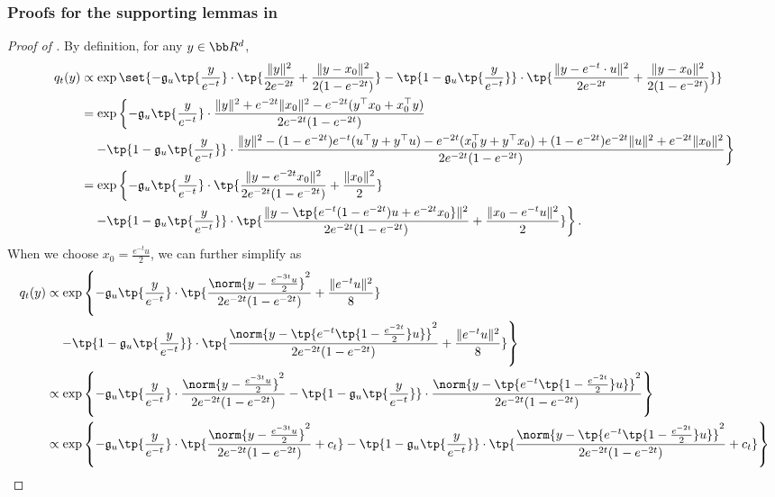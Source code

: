 \subsubsection{Proofs for the supporting lemmas in }\label{subsec:proof2}
\begin{proof}[Proof of ]
    By definition, for any $y\in \bb R^d$,
    \begin{align}
        q_t(y) &\propto \exp\set{-\mathfrak{g}_{u}\tp{\frac{y}{e^{-t}}}\cdot \tp{\frac{\|y\|^2}{2e^{-2t}} +\frac{\|y-x_0\|^2}{2(1-e^{-2t})}} - \tp{1-\mathfrak{g}_{u}\tp{\frac{y}{e^{-t}}}}\cdot \tp{\frac{\|y-e^{-t}\cdot u\|^2}{2e^{-2t}} + \frac{\|y-x_0\|^2}{2(1-e^{-2t})}} } \notag \\
        &= \exp\left\{-\mathfrak{g}_{u}\tp{\frac{y}{e^{-t}}}\cdot \frac{\|y\|^2 + e^{-2t}\|x_0\|^2 - e^{-2t}(y^{\top}x_0 + x_0^{\top}y)}{2e^{-2t}(1-e^{-2t})} \right. \notag \\
        & \quad  \left. - \tp{1-\mathfrak{g}_{u}\tp{\frac{y}{e^{-t}}}}\cdot \frac{\|y\|^2 - (1-e^{-2t})e^{-t}(u^{\top}y + y^{\top}u) - e^{-2t}(x_0^{\top}y + y^{\top}x_0) + (1-e^{-2t})e^{-2t}\|u\|^2 + e^{-2t}\|x_0\|^2}{2e^{-2t}(1-e^{-2t})} \right\} \notag  \\
        &= \exp\left\{-\mathfrak{g}_{u}\tp{\frac{y}{e^{-t}}}\cdot \tp{\frac{\|y-e^{-2t}x_0\|^2}{2e^{-2t}(1-e^{-2t})} + \frac{\|x_0\|^2}{2}} \right. \notag \\
        & \quad \left.- \tp{1-\mathfrak{g}_{u}\tp{\frac{y}{e^{-t}}}}\cdot \tp{\frac{\|y- \tp{e^{-t}(1-e^{-2t})u + e^{-2t}x_0}\|^2}{2e^{-2t}(1-e^{-2t})} + \frac{\|x_0 - e^{-t}u\|^2}{2}}\right\}.\label{eq:stitched1}
    \end{align}
    When we choose $x_0 = \frac{e^{-t}u}{2}$, we can further simplify  as
    \begin{align*}
        q_t(y) & \propto \exp\left\{-\mathfrak{g}_{u}\tp{\frac{y}{e^{-t}}}\cdot \tp{\frac{\norm{y-\frac{e^{-3t}u}{2}}^2}{2e^{-2t}(1-e^{-2t})} + \frac{\|e^{-t}u\|^2}{8}} \right. \notag \\
        & \quad \left.- \tp{1-\mathfrak{g}_{u}\tp{\frac{y}{e^{-t}}}}\cdot \tp{\frac{\norm{y- \tp{e^{-t}\tp{1-\frac{e^{-2t}}{2}}u }}^2}{2e^{-2t}(1-e^{-2t})} + \frac{\|e^{-t}u\|^2}{8}}\right\} \notag  \\
        &\propto \exp\left\{-\mathfrak{g}_{u}\tp{\frac{y}{e^{-t}}}\cdot \frac{\norm{y-\frac{e^{-3t}u}{2}}^2}{2e^{-2t}(1-e^{-2t})}  - \tp{1-\mathfrak{g}_{u}\tp{\frac{y}{e^{-t}}}}\cdot \frac{\norm{y- \tp{e^{-t}\tp{1-\frac{e^{-2t}}{2}}u }}^2}{2e^{-2t}(1-e^{-2t})} \right\}  \notag \\
        &\propto \exp\left\{-\mathfrak{g}_{u}\tp{\frac{y}{e^{-t}}}\cdot \tp{\frac{\norm{y-\frac{e^{-3t}u}{2}}^2}{2e^{-2t}(1-e^{-2t})} + c_t} - \tp{1-\mathfrak{g}_{u}\tp{\frac{y}{e^{-t}}}}\cdot \tp{\frac{\norm{y- \tp{e^{-t}\tp{1-\frac{e^{-2t}}{2}}u }}^2}{2e^{-2t}(1-e^{-2t})} + c_t}\right\}
    \end{align*}
\end{proof}


